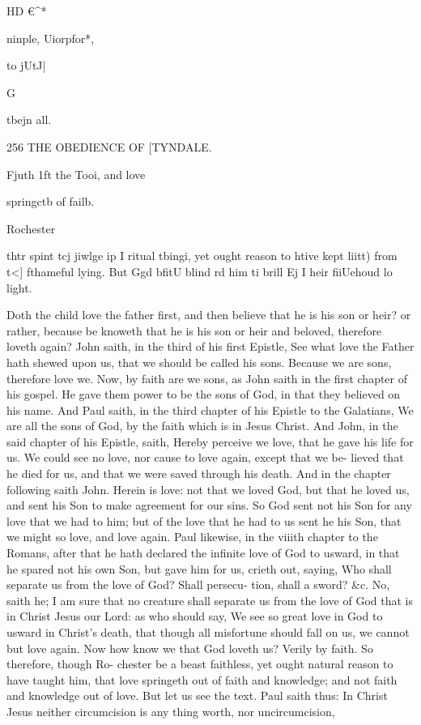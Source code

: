 \documentclass{custom}
\begin{document}
{HD €^* 

ninple, 
Uiorpfor*, 

to jUtJ|{G 

tbejn all. 


256
THE OBEDIENCE OF
[TYNDALE.

Fjuth 1ft the 
Tooi, and 
love 

springctb 
of failb. 

Rochester 

thtr spint 
tcj jiwlge 
ip I ritual 
tbingi, yet 
ought 
reason to 
htive kept 
liitt) from 
t<] fthameful 
lying. But 
Ggd bfitU 
blind rd 
him ti 
brill Ej I heir 
fiiUehoud 
lo light. 

Doth the child love the father first, and then believe that 
he is his son or heir? or rather, because be knoweth that 
he is his son or heir and beloved, therefore loveth again? 
John saith, in the third of his first Epistle, See what love 
the Father hath shewed upon us, that we should be called
his sons. Because we are sons, therefore love we. Now, 
by faith are we sons, as John saith in the first chapter of 
his gospel. He gave them power to be the sons of God, 
in that they believed on his name. And Paul saith, in 
the third chapter of his Epistle to the Galatians, We are 
all the sons of God, by the faith which is in Jesus Christ. 
And John, in the said chapter of his Epistle, saith, Hereby 
perceive we love, that he gave his life for us. We could 
see no love, nor cause to love again, except that we be- 
lieved that he died for us, and that we were saved through 
his death. And in the chapter following saith John. 
Herein is love: not that we loved God, but that he loved 
us, and sent his Son to make agreement for our sins. So 
God sent not his Son for any love that we had to him; 
but of the love that he had to us sent he his Son, that we 
might so love, and love again. Paul likewise, in the 
viiith chapter to the Romans, after that he hath declared 
the infinite love of God to usward, in that he spared not 
his own Son, but gave him for us, crieth out, saying, Who 
shall separate us from the love of God? Shall persecu- 
tion, shall a sword? &c. No, saith he; I am sure that 
no creature shall separate us from the love of God 
that is in Christ Jesus our Lord: as who should say, 
We see so great love in God to usward in Christ's 
death, that though all misfortune should fall on us, we
cannot but love again. Now how know we that God 
loveth us? Verily by faith. So therefore, though Ro- 
chester be a beast faithless, yet ought natural reason to
have taught him, that love springeth out of faith and 
knowledge; and not faith and knowledge out of love. 
But let us see the text. Paul saith thus: In Christ Jesus 
neither circumcision is any thing worth, nor uncircumcision, 


}}
\end{document}
